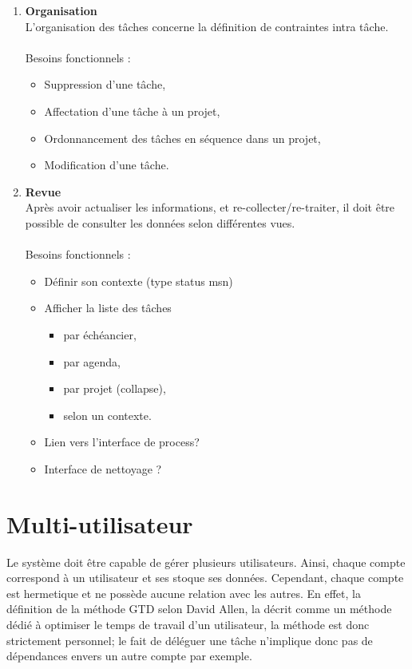 \begin{enumerate}
\item \textbf{Organisation}
\\L'organisation des tâches concerne la définition de contraintes intra tâche.
\\\\Besoins fonctionnels :
	\begin{itemize}	\renewcommand{\labelitemi}{$\Rightarrow$}
	\item Suppression d'une tâche,
	\item Affectation d'une tâche à un projet,
	\item Ordonnancement des tâches en séquence dans un projet, 
	\item Modification d'une tâche.\\
	\end{itemize}
	

\item \textbf{Revue}	
\\Après avoir actualiser les informations, et re-collecter/re-traiter, il doit être possible de consulter les données selon différentes vues.
\\\\Besoins fonctionnels :
	\begin{itemize}	\renewcommand{\labelitemi}{$\Rightarrow$}
	\item Définir son contexte (type status msn)
	\item Afficher la liste des tâches
		\begin{itemize}
			\item par échéancier,
			\item par agenda,
			\item par projet (collapse),
			\item selon un contexte.\\
		\end{itemize}
	\item Lien vers l'interface de process?
	\item Interface de nettoyage ?
	\end{itemize}
	
\end{enumerate}

\section{Multi-utilisateur}

Le système doit être capable de gérer plusieurs utilisateurs. Ainsi, chaque compte correspond à un utilisateur et ses stoque ses données. Cependant, chaque compte est hermetique et ne possède aucune relation avec les autres. En effet, la définition de la méthode GTD selon David Allen, la décrit comme un méthode dédié à optimiser le temps de travail d'un utilisateur, la méthode est donc strictement personnel; le fait de déléguer une tâche n'implique donc pas de dépendances envers un autre compte par exemple.
